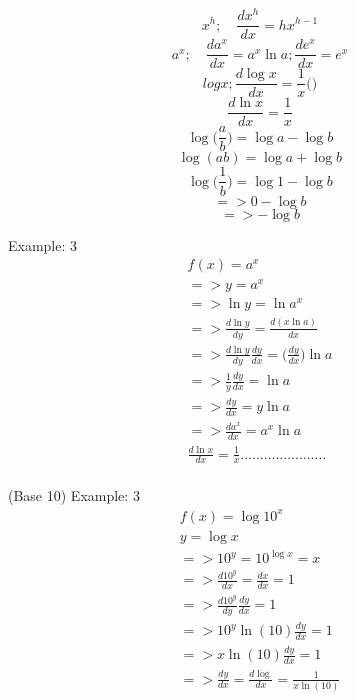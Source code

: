 			\begin{equation}
				x^h ;\quad \frac{dx^h}{dx} = hx^{h-1}
			\end{equation}
			\begin{equation}
				a^x; \quad \frac{da^x}{dx} = a^x\ln a;\frac{de^x}{dx} = e^x
			\end{equation}
			\begin{equation}
				log x; \frac{d\log x}{dx} = \frac{1}{x}\bigg(\bigg)
			\end{equation}
			\begin{equation}
				\frac{d\ln x}{dx} = \frac{1}{x}
			\end{equation}
			\newline
			\begin{equation}
				\log\bigg(\frac{a}{b}\bigg) = \log a - \log b
			\end{equation}
			\begin{equation}
				\log(ab)=\log a + \log b
			\end{equation}
			\begin{equation}
				\log \bigg(\frac{1}{b}\bigg) = \log 1-\log b
			\end{equation}
			\begin{displaymath}
				=> 0 - \log b
			\end{displaymath}
			\begin{displaymath}
				=> - \log b
			\end{displaymath}

			Example: 3
			\begin{align}
				f(x) = a^x \\
				=> y = a^x \\
				=> \ln y=\ln a^x \\
				=> \frac{d\ln y}{dy} = \frac{d(x\ln a)}{dx} \\
				=>\frac{d\ln y}{dy}\frac{dy}{dx} = \bigg(\frac{dy}{dx}\bigg)\ln a \\
				=> \frac{1}{y}\frac{dy}{dx} = \ln a \\
				=> \frac{dy}{dx} = y\ln a \\
				=>\frac{da^x}{dx} = a^x\ln a  \\
				\frac{d\ln x}{dx} = \frac{1}{x} ...................... \\
			\end{align}

			(Base 10)
			Example: 3
			\begin{align} 
				f(x) = \log10^x \\
				y = \log x \\
				=> 10^y = 10^{\log x} = x \\
				=>\frac{d10^y}{dx} = \frac{dx}{dx} = 1 \\
				=> \frac{d10^y}{dy}\frac{dy}{dx} = 1 \\
				=> 10^y \ln (10) \frac{dy}{dx} = 1 \\
				=>x \ln (10)\frac{dy}{dx} = 1 \\
				=> \frac{dy}{dx} = \frac{d\log}{dx} = \frac{1}{x\ln(10)} \\
			\end{align}

